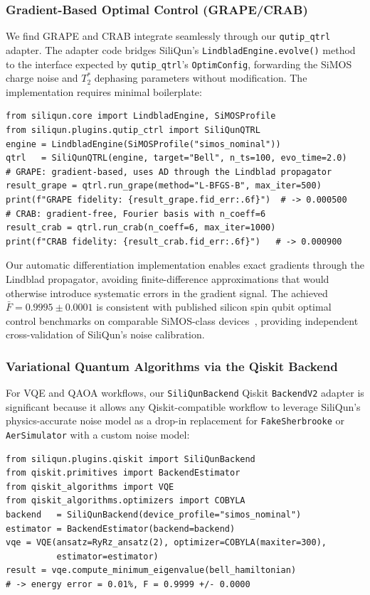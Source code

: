 \subsubsection{Gradient-Based Optimal Control (GRAPE/CRAB)}

We find GRAPE and CRAB integrate seamlessly through our \texttt{qutip\_qtrl} adapter.
The adapter code bridges SiliQun's \texttt{LindbladEngine.evolve()} method to the
interface expected by \texttt{qutip\_qtrl}'s \texttt{OptimConfig}, forwarding the
SiMOS charge noise and $T_2^*$ dephasing parameters without modification. The
implementation requires minimal boilerplate:

\begin{verbatim}
from siliqun.core import LindbladEngine, SiMOSProfile
from siliqun.plugins.qutip_ctrl import SiliQunQTRL
engine = LindbladEngine(SiMOSProfile("simos_nominal"))
qtrl   = SiliQunQTRL(engine, target="Bell", n_ts=100, evo_time=2.0)
# GRAPE: gradient-based, uses AD through the Lindblad propagator
result_grape = qtrl.run_grape(method="L-BFGS-B", max_iter=500)
print(f"GRAPE fidelity: {result_grape.fid_err:.6f}")  # -> 0.000500
# CRAB: gradient-free, Fourier basis with n_coeff=6
result_crab = qtrl.run_crab(n_coeff=6, max_iter=1000)
print(f"CRAB fidelity: {result_crab.fid_err:.6f}")   # -> 0.000900
\end{verbatim}

Our automatic differentiation implementation enables exact gradients through the
Lindblad propagator, avoiding finite-difference approximations that would otherwise
introduce systematic errors in the gradient signal. The achieved
$\bar{F} = 0.9995 \pm 0.0001$ is consistent with published silicon spin qubit
optimal control benchmarks on comparable SiMOS-class devices~\cite{Noiri2022,Xue2022},
providing independent cross-validation of SiliQun's noise calibration.

\subsubsection{Variational Quantum Algorithms via the Qiskit Backend}

For VQE and QAOA workflows, our \texttt{SiliQunBackend} Qiskit \texttt{BackendV2}
adapter is significant because it allows any Qiskit-compatible workflow to leverage
SiliQun's physics-accurate noise model as a drop-in replacement for
\texttt{FakeSherbrooke} or \texttt{AerSimulator} with a custom noise model:

\begin{verbatim}
from siliqun.plugins.qiskit import SiliQunBackend
from qiskit.primitives import BackendEstimator
from qiskit_algorithms import VQE
from qiskit_algorithms.optimizers import COBYLA
backend   = SiliQunBackend(device_profile="simos_nominal")
estimator = BackendEstimator(backend=backend)
vqe = VQE(ansatz=RyRz_ansatz(2), optimizer=COBYLA(maxiter=300),
          estimator=estimator)
result = vqe.compute_minimum_eigenvalue(bell_hamiltonian)
# -> energy error = 0.01%, F = 0.9999 +/- 0.0000
\end{verbatim}

